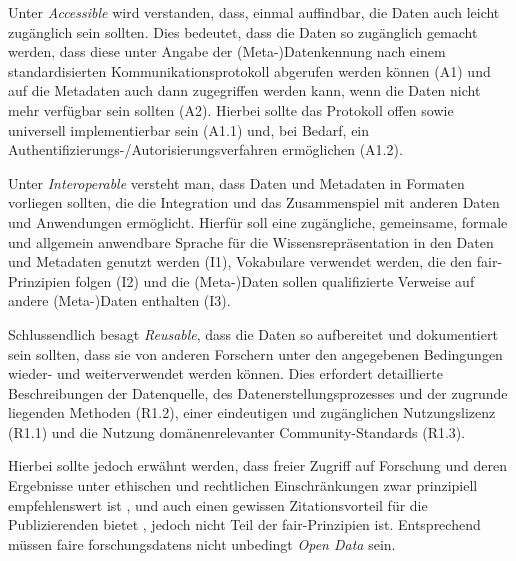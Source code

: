 Unter \textit{Accessible} wird verstanden, dass, einmal auffindbar, die Daten auch leicht zugänglich sein sollten.
Dies bedeutet, dass die Daten so zugänglich gemacht werden, dass diese unter Angabe der (Meta-)Datenkennung nach einem standardisierten Kommunikationsprotokoll abgerufen werden können (A1) und auf die Metadaten auch dann zugegriffen werden kann, wenn die Daten nicht mehr verfügbar sein sollten (A2).
Hierbei sollte das Protokoll offen sowie universell implementierbar sein (A1.1) und, bei Bedarf, ein Authentifizierungs-/Autorisierungsverfahren ermöglichen (A1.2).

Unter \textit{Interoperable} versteht man, dass Daten und Metadaten in Formaten vorliegen sollten, die die Integration und das Zusammenspiel mit anderen Daten und Anwendungen ermöglicht.
Hierfür soll eine zugängliche, gemeinsame, formale und allgemein anwendbare Sprache für die Wissensrepräsentation in den Daten und Metadaten genutzt werden (I1), Vokabulare verwendet werden, die den \gls{fair}-Prinzipien folgen (I2) und die (Meta-)Daten sollen qualifizierte Verweise auf andere (Meta-)Daten enthalten (I3).

Schlussendlich besagt \textit{Reusable}, dass die Daten so aufbereitet und dokumentiert sein sollten, dass sie von anderen Forschern unter den angegebenen Bedingungen wieder- und weiterverwendet werden können.
Dies erfordert detaillierte Beschreibungen der Datenquelle, des Datenerstellungsprozesses und der zugrunde liegenden Methoden (R1.2), einer eindeutigen und zugänglichen Nutzungslizenz (R1.1) und die Nutzung domänenrelevanter Community-Standards (R1.3).

Hierbei sollte jedoch erwähnt werden, dass freier Zugriff auf Forschung und deren Ergebnisse unter ethischen und rechtlichen Einschränkungen zwar prinzipiell empfehlenswert ist \autocite{Hopf2022}, und auch einen gewissen Zitationsvorteil für die Publizierenden bietet \autocite{Piwowar2013-DataReuse,Bautista-Puig2020}, jedoch nicht Teil der \gls{fair}-Prinzipien ist.
Entsprechend müssen \gls{fair}e \glspl{forschungsdaten} nicht unbedingt \textit{Open Data} sein.

